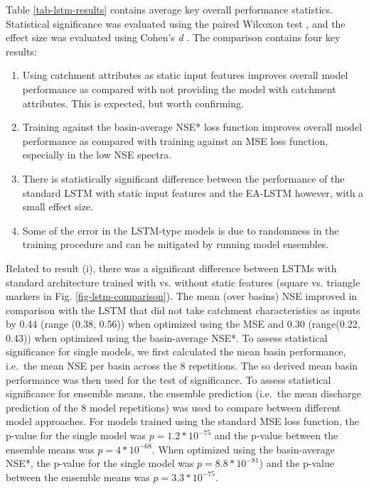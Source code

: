 Table \ref{tab-lstm-results} contains average key overall performance statistics. Statistical significance was evaluated using the paired Wilcoxon test \citep{wilcoxon1945individual}, and the effect size was evaluated using Cohen’s \textit{d} \citep{cohen2013statistical}. The comparison contains four key results:

\begin{enumerate}[label=(\roman*)]
  \item Using catchment attributes as static input features improves overall model performance as compared with not providing the model with catchment attributes. This is expected, but worth confirming.
  \item Training against the basin-average \gls{NSE*} loss function improves overall model performance as compared with training against an \gls{MSE} loss function, especially in the low \gls{NSE} spectra.
  \item There is statistically significant difference between the performance of the standard \gls{LSTM} with static input features and the \gls{EA-LSTM} however, with a small effect size.
  \item Some of the error in the \gls{LSTM}-type models is due to randomness in the training procedure and can be mitigated by running model ensembles.
\end{enumerate}

Related to result (i), there was a significant difference between \glspl{LSTM} with standard architecture trained with vs. without static features (square vs. triangle markers in Fig. \ref{fig-lstm-comparison}). 
The mean (over basins) \gls{NSE} improved in comparison with the \gls{LSTM} that did not take catchment characteristics as inputs by 0.44 (range (0.38, 0.56)) when optimized using the \gls{MSE} and 0.30 (range(0.22, 0.43)) when optimized using the basin-average \gls{NSE*}. 
To assess statistical significance for single models, we first calculated the mean basin performance, i.e.\ the mean \gls{NSE} per basin across the 8 repetitions. The so derived mean basin performance was then used for the test of significance. To assess statistical significance for ensemble means, the ensemble prediction (i.e.\ the mean discharge prediction of the 8 model repetitions) was used to compare between different model approaches. For models trained using the standard \gls{MSE} loss function, the p-value for the single model was $p=1.2*10^{-75}$ and the p-value between the ensemble means was $p=4*10^{-68}$. When optimized using the basin-average \gls{NSE*}, the p-value for the single model was $p=8.8*10^{-81}$) and the p-value between the ensemble means was $p=3.3*10^{-75}$. 

